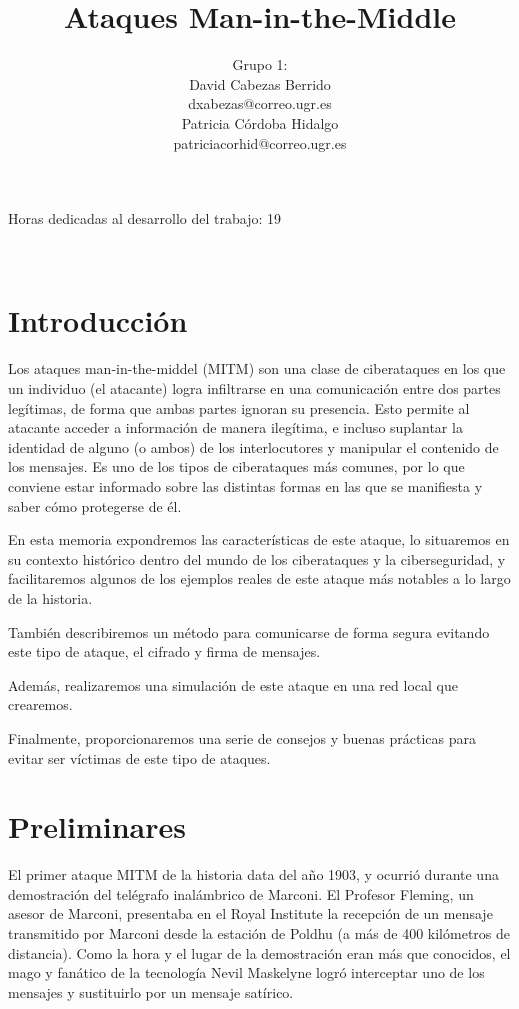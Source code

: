 \documentclass[11pt]{article}
\title{\Huge Ataques Man-in-the-Middle \vspace{10mm}}
\author{\Large Grupo 1: \vspace{10mm} \\
	\Large David Cabezas Berrido \vspace{5mm} \\ 
  \Large dxabezas@correo.ugr.es \vspace{10mm} \\
  \Large Patricia Córdoba Hidalgo \vspace{5mm} \\ 
	\Large patriciacorhid@correo.ugr.es \vspace{10mm}}
\begin{document}
\maketitle
\vfill
\begin{flushleft}
{\Large Horas dedicadas al desarrollo del trabajo: 19}
\end{flushleft}
\vspace{40mm}
~
\newpage
\tableofcontents
\newpage

\section{Introducción}

Los ataques man-in-the-middel (MITM) son una clase de ciberataques en los que un individuo (el atacante) logra infiltrarse en una
comunicación entre dos partes legítimas, de forma que ambas partes ignoran su presencia. Esto permite al atacante acceder a información
de manera ilegítima, e incluso suplantar la identidad de alguno (o ambos) de los interlocutores y manipular el contenido de los mensajes. Es uno de los tipos de ciberataques más comunes, por lo que conviene estar informado sobre las distintas formas
en las que se manifiesta y saber cómo protegerse de él.

En esta memoria expondremos las características de este ataque, lo situaremos en su contexto histórico dentro del mundo de los ciberataques y la
 ciberseguridad, y facilitaremos algunos de los ejemplos reales de este ataque más notables a lo largo de la historia.
 
 También describiremos un método para comunicarse de forma segura evitando este tipo de ataque, el cifrado y firma de mensajes.
 
Además, realizaremos una simulación de este ataque en una red local que crearemos.

Finalmente, proporcionaremos una serie de consejos y buenas prácticas para evitar ser víctimas de este tipo de ataques.

\section{Preliminares}

El primer ataque MITM de la historia data del año 1903, y ocurrió durante una demostración del telégrafo inalámbrico de Marconi.
El Profesor Fleming, un asesor de Marconi, presentaba en el Royal Institute la recepción de un mensaje transmitido por Marconi desde la estación de
 Poldhu (a más de 400 kilómetros de distancia). Como la hora y el lugar de la demostración eran más que conocidos, el mago y fanático de la
tecnología Nevil Maskelyne logró interceptar uno de los mensajes y sustituirlo por un mensaje satírico.
\end{document}
